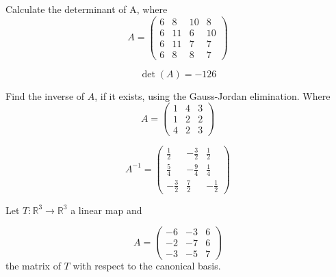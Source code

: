 \begin{questions}

\question Calculate the determinant of A, where
$$
A=\left(\begin{array}{rrrr}
6 & 8 & 10 & 8 \\
6 & 11 & 6 & 10 \\
6 & 11 & 7 & 7 \\
6 & 8 & 8 & 7
\end{array}\right)
$$

\begin{solution}
$$\det(A)=-126$$
\end{solution}

\question Find the inverse of $A$, if it exists, using the Gauss-Jordan elimination. Where
$$
A=\left(\begin{array}{rrr}
1 & 4 & 3 \\
1 & 2 & 2 \\
4 & 2 & 3
\end{array}\right)
$$

\begin{solution}
$$A^{-1}=\left(\begin{array}{rrr}
\frac{1}{2} & -\frac{3}{2} & \frac{1}{2} \\
\frac{5}{4} & -\frac{9}{4} & \frac{1}{4} \\
-\frac{3}{2} & \frac{7}{2} & -\frac{1}{2}
\end{array}\right)$$
\end{solution}

\question Let $T:\mathbb{R}^3\rightarrow\mathbb{R}^3$  a linear map and
 
$$
A=\left(\begin{array}{rrr}
-6 & -3 & 6 \\
-2 & -7 & 6 \\
-3 & -5 & 7
\end{array}\right)
$$
the matrix of $T$ with respect to the canonical basis.
\end{questions}
